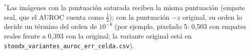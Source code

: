 \begin{table}[tbp]
\smallskip
\parbox{\linewidth}{\scriptsize $^{\ast}$Las imágenes con la puntuación saturada reciben la misma puntuación (empate real, que el AUROC cuenta como $\tfrac{1}{2}$); con la puntuación $-z$ original, su orden lo decide un término del orden de $10^{-8}$ (por ejemplo, pixelado 5: 0{,}503 con empates reales frente a 0{,}393 con la original; la variante original está en \texttt{stoodx\_variantes\_auroc\_err\_celda.csv}).}
\end{table}
